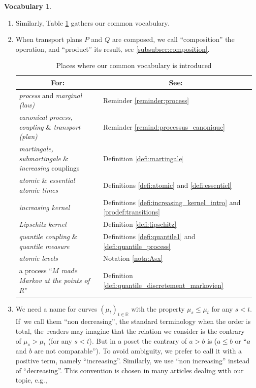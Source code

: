 \documentclass[11pt]{article}
\newcommand{\skpt}{\smallskip}
\theoremstyle{plain}
\theoremstyle{definition}
\newtheorem{vocabulary}[them]{Vocabulary}
\newcommand{\R}{\mathbb{R}}
\begin{document}
\skpt
\begin{vocabulary}
\begin{enumerate}
\item
Similarly, Table \ref{table:vocabulary} gathers our common vocabulary.

\item
When transport plans $P$ and $Q$ are composed, we call ``composition'' the oper\-a\-tion, and ``product'' its result, see \ref{subsubsec:composition}.
\begin{table}[htb]
\small\hspace*{\fill}\begin{tabular}{l|l}
\multicolumn{1}{c|}{For:}&\multicolumn{1}{c}{See:}\\\hline
\emph{process} and \emph{marginal (law)} & Reminder \ref{reminder:process}\\
\emph{canonical process, coupling} \& \emph{transport (plan)} & Reminder \ref{remind:processus_canonique}\\
\emph{martingale, submartingale} \& \emph{increasing} couplings
& Definition \ref{defi:martingale}\\
\emph{atomic} \& \emph{essential atomic times} & Definitions \ref{defi:atomic} and \ref{defi:essentiel}\\
\emph{increasing kernel} & Definitions \ref{defi:increasing_kernel_intro} and \ref{prodef:transitions}\\
\emph{Lipschitz kernel} & Definition \ref{defi:lipschitz}\\
\emph{quantile coupling} \& \emph{quantile measure} & Definitions \ref{defi:quantile1} and \ref{defi:quantile_process}\\
\emph{atomic levels} & Notation \ref{nota:Asx}\\
a process ``\emph{$M$ made Markov at the points of $R$}'' & Definition \ref{defi:quantile_discretement_markovien}\\
\end{tabular}\hspace*{\fill}\hspace*{\fill}\normalsize
\vspace*{.5\baselineskip}
\caption{\label{table:vocabulary}Places where our common vocabulary is introduced}
\end{table}

\item
We need a name for curves $(\mu_t)_{t\in\R}$ with the property $\mu_s\leqslant \mu_t$ for any \hbox{$s<t$}. If~we call them ``non decreasing'', the standard terminology when the order is total, the~readers may imagine that the relation we consider is the contrary of $\mu_s>\mu_t$ (for any $s<t$). But in a poset the contrary of $a>b$ is ($a\leq b$ or ``$a$ and $b$ are not comparable''). To avoid ambiguity, we prefer to call it with a positive term, namely ``increasing''. Similarly, we use ``non increasing'' instead of ``decreasing''. This convention is chosen in many articles dealing with our topic, e.g., \cite{SS,KaKr,Low2,HiRoYo14}
\end{enumerate}
\end{vocabulary}
\end{document}
